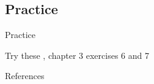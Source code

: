 \documentclass{beamer}
\newcommand{\subtwotwo}{Practice}
\begin{document}
    \subsection{\subtwotwo}
      \begin{frame}{\subtwotwo}
        \begin{block}{Try these}
          \textcite{dawson_language_2016}, chapter 3 exercises 6 and 7
        \end{block}
      \end{frame}

      \begin{frame}{References}
        \printbibliography
      \end{frame}
\end{document}
